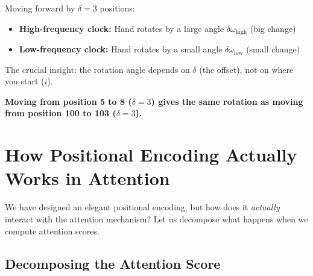 \documentclass{article}
\begin{document}
\begin{center}
\end{center}

Moving forward by $\delta = 3$ positions:
\begin{itemize}
\item \textbf{High-frequency clock:} Hand rotates by a large angle $\delta \omega_{\text{high}}$ (big change)
\item \textbf{Low-frequency clock:} Hand rotates by a small angle $\delta \omega_{\text{low}}$ (small change)
\end{itemize}

The crucial insight: the rotation angle depends on $\delta$ (the offset), not on where you start ($i$).

\textbf{Moving from position 5 to 8 ($\delta=3$) gives the same rotation as moving from position 100 to 103 ($\delta=3$).}

\section{How Positional Encoding Actually Works in Attention}

We have designed an elegant positional encoding, but how does it \textit{actually} interact with the attention mechanism? Let us decompose what happens when we compute attention scores.

\subsection{Decomposing the Attention Score}
\end{document}
